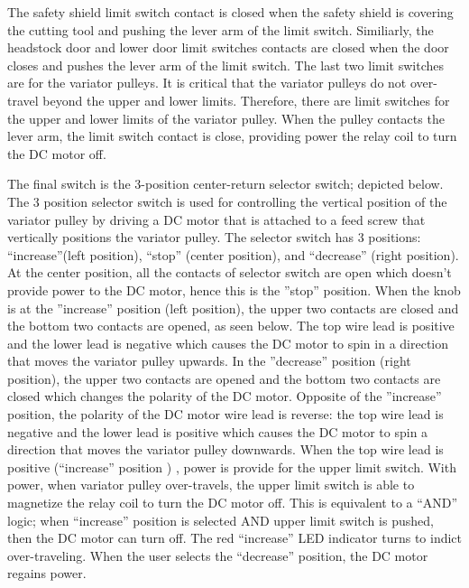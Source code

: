 The safety shield limit switch contact is closed when the safety shield is covering the cutting tool and  pushing the lever arm of the limit switch. Similiarly, the headstock door and lower door limit switches contacts are closed when the door closes and pushes the lever arm of the limit switch. The last two limit switches are for the variator pulleys. It is critical that the variator pulleys do not over-travel beyond the upper and lower limits. Therefore, there are limit switches for the upper and lower limits of the variator pulley. When the pulley contacts the  lever arm, the limit switch contact is close, providing power the relay coil to turn the DC motor off.

The final switch is the 3-position center-return selector switch; depicted below. The 3 position selector switch is used for controlling the vertical position of the variator pulley by driving a DC motor that is attached to a feed screw that vertically positions the variator pulley. The selector switch has 3 positions: ``increase''(left position), ``stop'' (center position), and ``decrease'' (right position). At the center position, all the contacts of selector switch are open which doesn’t provide power to the DC motor, hence this is the ”stop” position. When the knob is at the ”increase” position (left position), the upper two contacts are closed and the bottom two contacts are opened, as seen below. The top wire lead is positive and the lower lead is negative which causes the DC motor to spin in a direction that moves the variator pulley upwards. In the ”decrease” position (right position), the upper two contacts are opened and the bottom two contacts are closed which changes the polarity of the DC motor. Opposite of the ”increase” position, the polarity of the DC motor wire lead is reverse: the top wire lead is negative and the lower lead is positive which causes the DC motor to spin a direction that moves the variator pulley downwards. When the top wire lead is positive (``increase'' position ) , power is provide for the upper limit switch. With power, when variator pulley over-travels, the upper limit switch is able to magnetize the relay coil to turn the DC motor off. This is equivalent to a ``AND'' logic; when ``increase'' position is selected AND upper limit switch is pushed, then the DC motor can turn off.  The red ``increase'' LED indicator turns to indict over-traveling. When the user selects the ``decrease'' position, the DC motor regains power.

